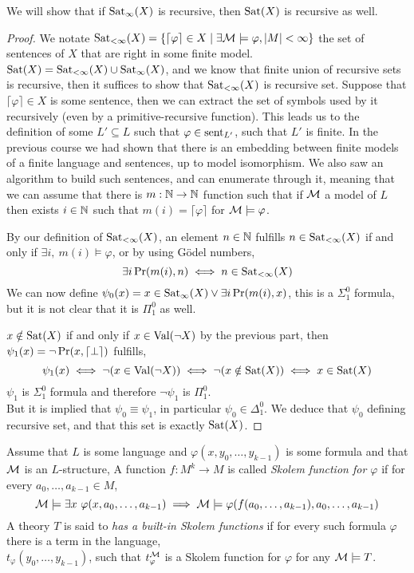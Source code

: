 \subquestion{}
We will show that if $\operatorname{Sat}_{\infty}(X)$ is recursive, then $\operatorname{Sat}(X)$ is recursive as well.
\begin{proof}
	We notate $\operatorname{Sat}_{< \infty}(X) = \{ \lceil \varphi \rceil \in X \mid \exists \mathcal{M} \models \varphi, |M| < \infty \}$ the set of sentences of $X$ that are right in some finite model.
	$\operatorname{Sat}(X) = \operatorname{Sat}_{< \infty}(X) \cup \operatorname{Sat}_{\infty}(X)$, and we know that finite union of recursive sets is recursive, then it suffices to show that $\operatorname{Sat}_{< \infty}(X)$ is recursive set.
	Suppose that $\lceil \varphi \rceil \in X$ is some sentence, then we can extract the set of symbols used by it recursively (even by a primitive-recursive function).
	This leads us to the definition of some $L' \subseteq L$ such that $\varphi \in \operatorname{sent}_{L'}$, such that $L'$ is finite.
	In the previous course we had shown that there is an embedding between finite models of a finite language and sentences, up to model isomorphism.
	We also saw an algorithm to build such sentences, and can enumerate through it,
	meaning that we can assume that there is $m : \mathbb{N} \to \mathbb{N}$ function such that if $\mathcal{M}$ a model of $L$ then exists $i \in \mathbb{N}$ such that $m(i) = \lceil \varphi \rceil$ for $\mathcal{M} \models \varphi$.

	By our definition of $\operatorname{Sat}_{< \infty}(X)$, an element $n \in \mathbb{N}$ fulfills $n \in \operatorname{Sat}_{< \infty}(X)$ if and only if $\exists i,\ m(i) \models \varphi$, or by using Gödel numbers,
	\[
		\exists i \operatorname{Pr}(m(i), n)
		\iff n \in \operatorname{Sat}_{< \infty}(X)
	\]
	We can now define $\psi_0(x) = x \in \operatorname{Sat}_{\infty}(X) \lor \exists i \operatorname{Pr}(m(i), x)$, this is a $\Sigma_1^0$ formula, but it is not clear that it is $\Pi_1^0$ as well.

	$x \notin \operatorname{Sat}(X)$ if and only if $x \in \operatorname{Val}(\lnot X)$ by the previous part, then $\psi_1(x) = \lnot \operatorname{Pr}(x, \lceil \perp \rceil)$ fulfills,
	\[
		\psi_1(x)
		\iff \lnot (x \in \operatorname{Val}(\lnot X))
		\iff \lnot (x \notin \operatorname{Sat}(X))
		\iff x \in \operatorname{Sat}(X)
	\]
	$\psi_1$ is $\Sigma_1^0$ formula and therefore $\lnot \psi_1$ is $\Pi_1^0$. \\
	But it is implied that $\psi_0 \equiv \psi_1$, in particular $\psi_0 \in \Delta_1^0$.
	We deduce that $\psi_0$ defining recursive set, and that this set is exactly $\operatorname{Sat}(X)$.
\end{proof}

\question{}
Assume that $L$ is some language and $\varphi(x, y_0, \ldots, y_{k - 1})$ is some formula and that $\mathcal{M}$ is an $L$-structure,
A function $f : M^k \to M$ is called \textit{Skolem function for $\varphi$} if for every $a_0, \ldots, a_{k - 1} \in M$,
\[
	\mathcal{M} \models \exists x\ \varphi(x, a_0, \ldots, a_{k - 1})
	\implies \mathcal{M} \models \varphi(f(a_0, \ldots, a_{k - 1}), a_0, \ldots, a_{k - 1})
\]
A theory $T$ is said to \textit{has a built-in Skolem functions} if for every such formula $\varphi$ there is a term in the language, \\
$t_{\varphi}(y_0, \ldots, y_{k - 1})$, such that $t_\varphi^{\mathcal{M}}$ is a Skolem function for $\varphi$ for any $\mathcal{M} \models T$.


